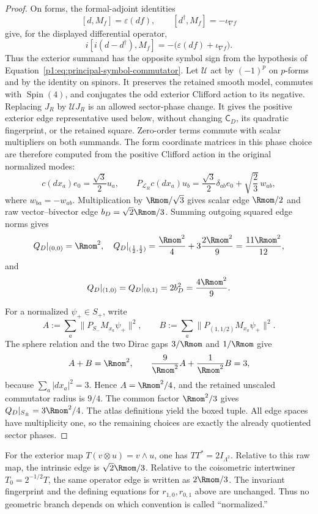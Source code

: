 \documentclass[11pt]{article}
\begin{document}
\begin{proof}
On forms, the formal-adjoint identities
\[
 [d,M_f]=\varepsilon(df),\qquad
 [d^\dagger,M_f]=-\iota_{\nabla f}
\]
give, for the displayed differential operator,
\[
 i[i(d-d^\dagger),M_f]
 =-\bigl(\varepsilon(df)+\iota_{\nabla f}\bigr).
\]
Thus the exterior summand has the opposite symbol sign from the hypothesis
of Equation~\eqref{p1:eq:principal-symbol-commutator}.  Let
\(\mathcal U\) act by \((-1)^p\) on \(p\)-forms and by the identity on
spinors.  It preserves the retained smooth model, commutes with
\(\operatorname{Spin}(4)\), and conjugates the odd exterior Clifford action to its
negative.  Replacing \(J_R\) by \(\mathcal UJ_R\) is an allowed sector-phase
change.  It gives the positive exterior edge representative used below,
without changing \(\mathsf C_D\), its quadratic fingerprint, or the retained
square.  Zero-order terms commute with scalar multipliers on both summands.
The form coordinate matrices in this phase choice are therefore computed
from the positive Clifford action in the original normalized modes:
\[
 c(dx_a)e_0=\frac{\sqrt3}{2}u_a,
 \qquad
 P_{\mathcal L_R}c(dx_a)u_b
 =\frac{\sqrt3}{2}\delta_{ab}e_0
  +\sqrt{\frac23}\,w_{ab},
\]
where \(w_{ba}=-w_{ab}\).  Multiplication by \(\Rmom/\sqrt3\) gives scalar
edge \(\Rmom/2\) and raw vector--bivector edge
\(b_D=\sqrt2\Rmom/3\).  Summing outgoing squared edge norms gives
\[
 Q_D|_{(0,0)}=\Rmom^2,
 \quad
 Q_D|_{(\frac12,\frac12)}
 =\frac{\Rmom^2}{4}+3\frac{2\Rmom^2}{9}
 =\frac{11\Rmom^2}{12},
\]
and
\[
 Q_D|_{(1,0)}=Q_D|_{(0,1)}=2b_D^2
 =\frac{4\Rmom^2}{9}.
\]

For a normalized \(\psi_+\in S_+\), write
\[
 A:=\sum_a\|P_{S_-}M_{x_a}\psi_+\|^2,
 \qquad
 B:=\sum_a\|P_{(1,1/2)}M_{x_a}\psi_+\|^2.
\]
The sphere relation and the two Dirac gaps \(3/\Rmom\) and \(1/\Rmom\)
give
\[
 A+B=\Rmom^2,
 \qquad
 \frac9{\Rmom^2}A+\frac1{\Rmom^2}B=3,
\]
because \(\sum_a|dx_a|^2=3\).  Hence
\(A=\Rmom^2/4\), and the retained unscaled commutator radius is
\(9/4\).  The common factor \(\Rmom^2/3\) gives
\(Q_D|_{S_\pm}=3\Rmom^2/4\).  The atlas definitions yield the boxed tuple.
All edge spaces have multiplicity one, so the remaining choices are exactly
the already quotiented sector phases.
\end{proof}

\begin{remark}
\label{p1:rem:intrinsic-edge-normalization-conversion}
For the exterior map \(T(v\otimes u)=v\wedge u\), one has
\(TT^*=2I_{\Lambda^2}\).  Relative to this raw map, the intrinsic edge is
\(\sqrt2\Rmom/3\).  Relative to the coisometric intertwiner
\(T_0=2^{-1/2}T\), the same operator edge is written as \(2\Rmom/3\).
The invariant fingerprint and the defining equations for
\(r_{1,0},r_{0,1}\) above are unchanged. Thus no geometric
branch depends on which convention is called ``normalized.''
\end{remark}
\end{document}
